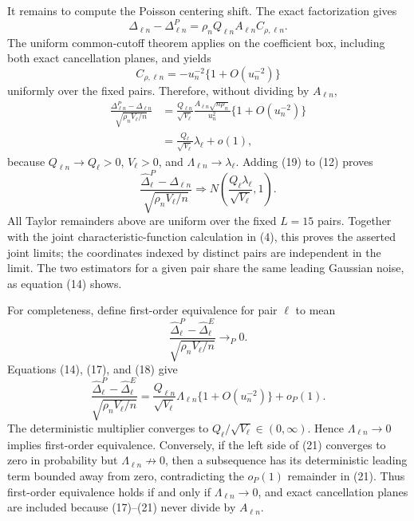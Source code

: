 It remains to compute the Poisson centering shift. The exact factorization gives
\[
 \Delta_{\ell n}-\Delta^P_{\ell n}
 =\rho_nQ_{\ell n}A_{\ell n}C_{\rho,\ell n}.
\tag{17}
\]
The uniform common-cutoff theorem applies on the coefficient box, including both exact cancellation planes, and yields
\[
 C_{\rho,\ell n}=-u_n^{-2}\{1+O(u_n^{-2})\}
\tag{18}
\]
uniformly over the fixed pairs. Therefore, without dividing by \(A_{\ell n}\),
\[
 \begin{aligned}
 \frac{\Delta^P_{\ell n}-\Delta_{\ell n}}
 {\sqrt{\rho_nV_\ell/n}}
 &=\frac{Q_{\ell n}}{\sqrt{V_\ell}}
 \frac{A_{\ell n}\sqrt{n\rho_n}}{u_n^2}
 \{1+O(u_n^{-2})\}\\
 &=\frac{Q_\ell}{\sqrt{V_\ell}}\lambda_\ell+o(1),
 \end{aligned}
\tag{19}
\]
because \(Q_{\ell n}\to Q_\ell>0\), \(V_\ell>0\), and \(\Lambda_{\ell n}\to\lambda_\ell\). Adding (19) to (12) proves
\[
 \frac{\widehat\Delta^P_\ell-\Delta_{\ell n}}
 {\sqrt{\rho_nV_\ell/n}}
 \Rightarrow N\!\left(\frac{Q_\ell\lambda_\ell}{\sqrt{V_\ell}},1\right).
\tag{20}
\]
All Taylor remainders above are uniform over the fixed \(L=15\) pairs. Together with the joint characteristic-function calculation in (4), this proves the asserted joint limits; the coordinates indexed by distinct pairs are independent in the limit. The two estimators for a given pair share the same leading Gaussian noise, as equation (14) shows.

For completeness, define first-order equivalence for pair \(\ell\) to mean
\[
 \frac{\widehat\Delta^P_\ell-\widehat\Delta^E_\ell}
 {\sqrt{\rho_nV_\ell/n}}\longrightarrow_P0.
\]
Equations (14), (17), and (18) give
\[
 \frac{\widehat\Delta^P_\ell-\widehat\Delta^E_\ell}
 {\sqrt{\rho_nV_\ell/n}}
 =\frac{Q_{\ell n}}{\sqrt{V_\ell}}\Lambda_{\ell n}
 \{1+O(u_n^{-2})\}+o_P(1).
\tag{21}
\]
The deterministic multiplier converges to \(Q_\ell/\sqrt{V_\ell}\in(0,\infty)\). Hence \(\Lambda_{\ell n}\to0\) implies first-order equivalence. Conversely, if the left side of (21) converges to zero in probability but \(\Lambda_{\ell n}\not\to0\), then a subsequence has its deterministic leading term bounded away from zero, contradicting the \(o_P(1)\) remainder in (21). Thus first-order equivalence holds if and only if \(\Lambda_{\ell n}\to0\), and exact cancellation planes are included because (17)--(21) never divide by \(A_{\ell n}\).
